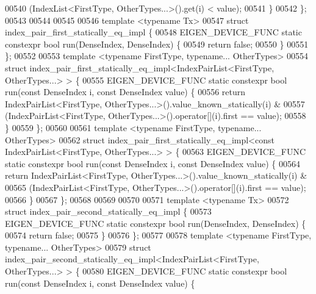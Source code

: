 \begin{DoxyCode}
00540         (IndexList<FirstType, OtherTypes...>().\textcolor{keyword}{get}(i) < value);
00541   \}
00542 \};
00543 
00544 
00545 
00546 \textcolor{keyword}{template} <\textcolor{keyword}{typename} Tx>
00547 \textcolor{keyword}{struct }index\_pair\_first\_statically\_eq\_impl \{
00548   EIGEN\_DEVICE\_FUNC \textcolor{keyword}{static} constexpr \textcolor{keywordtype}{bool} run(DenseIndex, DenseIndex) \{
00549     \textcolor{keywordflow}{return} \textcolor{keyword}{false};
00550   \}
00551 \};
00552 
00553 \textcolor{keyword}{template} <\textcolor{keyword}{typename} FirstType, \textcolor{keyword}{typename}... OtherTypes>
00554 \textcolor{keyword}{struct }index\_pair\_first\_statically\_eq\_impl<IndexPairList<FirstType, OtherTypes...> > \{
00555   EIGEN\_DEVICE\_FUNC \textcolor{keyword}{static} constexpr \textcolor{keywordtype}{bool} run(\textcolor{keyword}{const} DenseIndex i, \textcolor{keyword}{const} DenseIndex value) \{
00556     \textcolor{keywordflow}{return} IndexPairList<FirstType, OtherTypes...>().value\_known\_statically(i) &
00557         (IndexPairList<FirstType, OtherTypes...>().\textcolor{keyword}{operator}[](i).first == value);
00558   \}
00559 \};
00560 
00561 \textcolor{keyword}{template} <\textcolor{keyword}{typename} FirstType, \textcolor{keyword}{typename}... OtherTypes>
00562 \textcolor{keyword}{struct }index\_pair\_first\_statically\_eq\_impl<const IndexPairList<FirstType, OtherTypes...> > \{
00563   EIGEN\_DEVICE\_FUNC \textcolor{keyword}{static} constexpr \textcolor{keywordtype}{bool} run(\textcolor{keyword}{const} DenseIndex i, \textcolor{keyword}{const} DenseIndex value) \{
00564     \textcolor{keywordflow}{return} IndexPairList<FirstType, OtherTypes...>().value\_known\_statically(i) &
00565         (IndexPairList<FirstType, OtherTypes...>().\textcolor{keyword}{operator}[](i).first == value);
00566   \}
00567 \};
00568 
00569 
00570 
00571 \textcolor{keyword}{template} <\textcolor{keyword}{typename} Tx>
00572 \textcolor{keyword}{struct }index\_pair\_second\_statically\_eq\_impl \{
00573   EIGEN\_DEVICE\_FUNC \textcolor{keyword}{static} constexpr \textcolor{keywordtype}{bool} run(DenseIndex, DenseIndex) \{
00574     \textcolor{keywordflow}{return} \textcolor{keyword}{false};
00575   \}
00576 \};
00577 
00578 \textcolor{keyword}{template} <\textcolor{keyword}{typename} FirstType, \textcolor{keyword}{typename}... OtherTypes>
00579 \textcolor{keyword}{struct }index\_pair\_second\_statically\_eq\_impl<IndexPairList<FirstType, OtherTypes...> > \{
00580   EIGEN\_DEVICE\_FUNC \textcolor{keyword}{static} constexpr \textcolor{keywordtype}{bool} run(\textcolor{keyword}{const} DenseIndex i, \textcolor{keyword}{const} DenseIndex value) \{

\end{DoxyCode}
